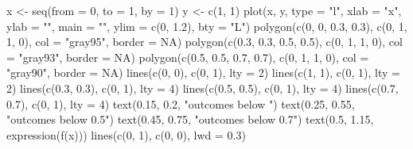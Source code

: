 \begin{Schunk}
\begin{Sinput}
 x <- seq(from = 0, to = 1, by = 1)
 y <- c(1, 1)
 plot(x, y, type = "l", xlab = "x", ylab = "", main = "", ylim = c(0, 1.2), bty = "L")
 polygon(c(0, 0, 0.3, 0.3), c(0, 1, 1, 0), col = "gray95", border = NA)
 polygon(c(0.3, 0.3, 0.5, 0.5), c(0, 1, 1, 0), col = "gray93", border = NA)
 polygon(c(0.5, 0.5, 0.7, 0.7), c(0, 1, 1, 0), col = "gray90", border = NA)
 lines(c(0, 0), c(0, 1), lty = 2)
 lines(c(1, 1), c(0, 1), lty = 2)
 lines(c(0.3, 0.3), c(0, 1), lty = 4)
 lines(c(0.5, 0.5), c(0, 1), lty = 4)
 lines(c(0.7, 0.7), c(0, 1), lty = 4)
 text(0.15, 0.2, "outcomes \n below ")
 text(0.25, 0.55, "outcomes below 0.5")
 text(0.45, 0.75, "outcomes below 0.7")
 text(0.5, 1.15, expression(f(x)))
 lines(c(0, 1), c(0, 0), lwd = 0.3)
\end{Sinput}
\end{Schunk}
